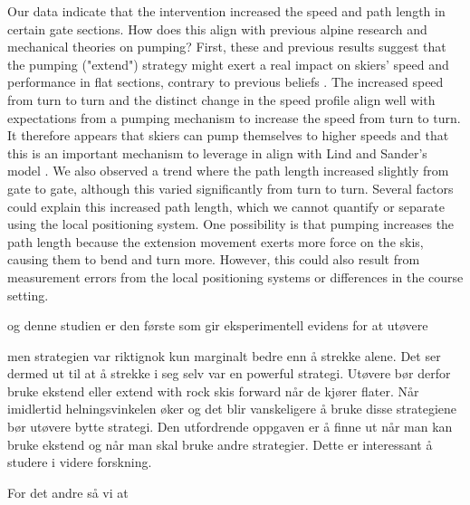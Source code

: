 Our data indicate that the intervention increased the speed and path length in certain gate sections. How does this align with previous alpine research and mechanical theories on pumping? First, these and previous results suggest that the pumping ("extend") strategy might exert a real impact on skiers' speed and performance in flat sections, contrary to previous beliefs \cite{supej_differential_2008, supej_doba_2001}. The increased speed from turn to turn and the distinct change in the speed profile align well with expectations from a pumping mechanism to increase the speed from turn to turn. It therefore appears that skiers can pump themselves to higher speeds and that this is an important mechanism to leverage in align with Lind and Sander's model \cite{lind_physics_2004}. We also observed a trend where the path length increased slightly from gate to gate, although this varied significantly from turn to turn. Several factors could explain this increased path length, which we cannot quantify or separate using the local positioning system. One possibility is that pumping increases the path length because the extension movement exerts more force on the skis, causing them to bend and turn more. However, this could also result from measurement errors from the local positioning systems or differences in the course setting.

























og denne studien er den første som gir eksperimentell evidens for at utøvere 


men strategien var riktignok kun marginalt bedre enn å strekke alene. Det ser dermed ut til at å strekke i seg selv var en powerful strategi. Utøvere bør derfor bruke ekstend eller extend with rock skis forward når de kjører flater. Når imidlertid helningsvinkelen øker og det blir vanskeligere å bruke disse strategiene bør utøvere bytte strategi. Den utfordrende oppgaven er å finne ut når man kan bruke ekstend og når man skal bruke andre strategier. Dette er interessant å studere i videre forskning.

For det andre så vi at


